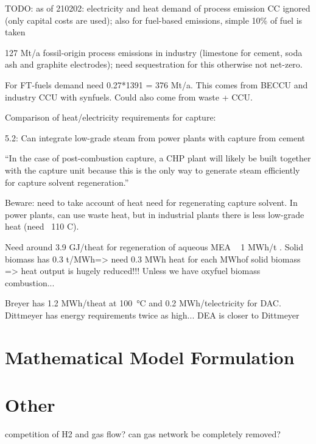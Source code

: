 TODO: as of 210202: electricity and heat demand of process emission CC ignored
(only capital costs are used); also for fuel-based emissions, simple 10\% of
fuel is taken

127 Mt\co/a fossil-origin process emissions in industry (limestone for cement,
soda ash and graphite electrodes); need sequestration for this otherwise not
net-zero.

For FT-fuels demand need 0.27*1391 = 376 Mt\co/a. This comes from BECCU and
industry CCU with synfuels. Could also come from waste + CCU.


Comparison of heat/electricity requirements for capture:

 5.2: Can integrate low-grade steam from power plants with
\co capture from cement

``In the case of post-combustion \co capture, a CHP plant will likely be built
together with the \co capture unit because this is the only way to generate
steam efficiently for \co capture solvent regeneration.''

Beware: need to take account of heat need for regenerating \co capture solvent.
In power plants, can use waste heat, but in industrial plants there is less
low-grade heat (need ~110 C). 

Need around 3.9 GJ/t\co heat for regeneration of aqueous MEA ~ 1 MWh/t\co
{}. Solid biomass has 0.3 t\co/MWh\th => need 0.3 MWh heat for
each MWh\th of solid biomass => heat output is hugely reduced!!! Unless we have
oxyfuel biomass combustion...

Breyer 
has 1.2 MWh/t\co heat at \SI{100}{\celsius} and 0.2 MWh\el/t\co electricity for DAC.
Dittmeyer has energy requirements twice as high... DEA is closer to Dittmeyer



\section{Mathematical Model Formulation}

\section{Other}

competition of H2 and gas flow? can gas network be completely removed?

